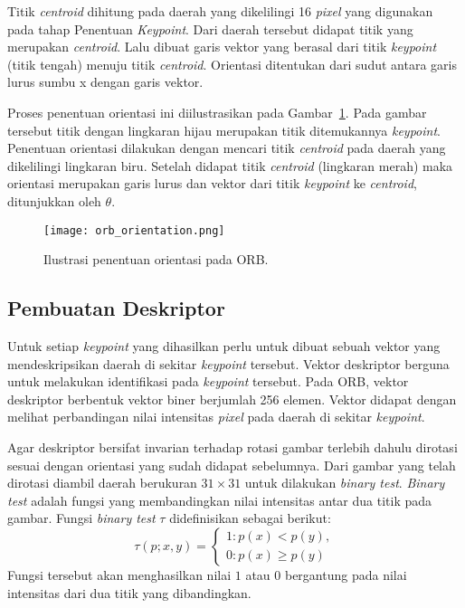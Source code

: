 Titik \textit{centroid} dihitung pada daerah yang dikelilingi 16 \textit{pixel} yang digunakan pada tahap Penentuan \textit{Keypoint}. Dari daerah tersebut didapat titik yang merupakan \textit{centroid}. Lalu dibuat garis vektor yang berasal dari titik \textit{keypoint} (titik tengah) menuju titik \textit{centroid}. Orientasi ditentukan dari sudut antara garis lurus sumbu x dengan garis vektor.

Proses penentuan orientasi ini diilustrasikan pada Gambar~\ref{fig:orb_orientation}. Pada gambar tersebut titik dengan lingkaran hijau merupakan titik ditemukannya \textit{keypoint}. Penentuan orientasi dilakukan dengan mencari titik \textit{centroid} pada daerah yang dikelilingi lingkaran biru. Setelah didapat titik \textit{centroid} (lingkaran merah) maka orientasi merupakan garis lurus dan vektor dari titik \textit{keypoint} ke \textit{centroid}, ditunjukkan oleh $\theta$.
\begin{figure}[H]
	\centering
	\texttt{[image: orb\_orientation.png]}
	\caption{Ilustrasi penentuan orientasi pada ORB.}
	\label{fig:orb_orientation}
\end{figure}

\subsection{Pembuatan Deskriptor}
\label{subsec:orb_deskriptor}
Untuk setiap \textit{keypoint} yang dihasilkan perlu untuk dibuat sebuah vektor yang mendeskripsikan daerah di sekitar \textit{keypoint} tersebut. Vektor deskriptor berguna untuk melakukan identifikasi pada \textit{keypoint} tersebut. Pada ORB, vektor deskriptor berbentuk vektor biner berjumlah 256 elemen. Vektor didapat dengan melihat perbandingan nilai intensitas \textit{pixel} pada daerah di sekitar \textit{keypoint}.

Agar deskriptor bersifat invarian terhadap rotasi gambar terlebih dahulu dirotasi sesuai dengan orientasi yang sudah didapat sebelumnya. Dari gambar yang telah dirotasi diambil daerah berukuran $31\times31$ untuk dilakukan \textit{binary test}. \textit{Binary test} adalah fungsi yang membandingkan nilai intensitas antar dua titik pada gambar. Fungsi \textit{binary test} $\tau$ didefinisikan sebagai berikut:
\begin{equation}
	\tau(p;x,y)=\begin{cases}
		1 :p(x) < p(y), \\
		0 :p(x) \geq p(y)
	\end{cases}
\end{equation}
Fungsi tersebut akan menghasilkan nilai $1$ atau $0$ bergantung pada nilai intensitas dari dua titik yang dibandingkan.

